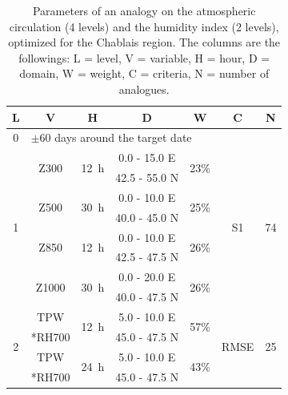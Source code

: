 \documentclass[twocol]{ametsoc}
\begin{document}
\begin{table}[htbp]
	\footnotesize
	\caption{Parameters of an analogy on the atmospheric circulation (4 levels) and the humidity index (2 levels), optimized for the Chablais region. The columns are the followings: L = level, V = variable, H = hour, D = domain, W = weight, C = criteria, N = number of analogues.}
	\begin{center}
		\begin{tabular}{ccccccc}
			\hline \textbf{L} & \textbf{V} & \textbf{H} & \textbf{D} & \textbf{W} & \textbf{C} & \textbf{N} \\ 
			\hline 
			0 & \multicolumn{6}{l}{$\pm 60$ days around the target date} \\
			\hline 
			\multirow{8}{*}{1} &  \multirow{2}{*}{Z300} & \multirow{2}{*}{12~h} & 0.0 - 15.0 \degree E & \multirow{2}{*}{23\%} & \multirow{8}{*}{S1} & \multirow{8}{*}{74} \\
			& & & 42.5 - 55.0 \degree N & & & \\ 
			& \multirow{2}{*}{Z500} & \multirow{2}{*}{30~h} & 0.0 - 10.0 \degree E & \multirow{2}{*}{25\%} & & \\ 
			& & & 40.0 - 45.0 \degree N & & & \\ 
			& \multirow{2}{*}{Z850} & \multirow{2}{*}{12~h} & 0.0 - 10.0 \degree E & \multirow{2}{*}{26\%} & & \\ 
			& & & 42.5 - 47.5 \degree N & & & \\ 
			& \multirow{2}{*}{Z1000} & \multirow{2}{*}{30~h} & 0.0 - 20.0 \degree E & \multirow{2}{*}{26\%} & & \\ 
			& & & 40.0 - 47.5 \degree N & & & \\ 
			\hline 
			\multirow{4}{*}{2} & TPW & \multirow{2}{*}{12~h} & 5.0 - 10.0 \degree E & \multirow{2}{*}{57\%} & \multirow{4}{*}{RMSE} & \multirow{4}{*}{25} \\
			& *RH700 & & 45.0 - 47.5 \degree N & & & \\ 
			& TPW & \multirow{2}{*}{24~h} & 5.0 - 10.0 \degree E & \multirow{2}{*}{43\%} & & \\ 
			& *RH700 & & 45.0 - 47.5 \degree N & & & \\ 
			\hline 
		\end{tabular} 
	\end{center}
	\label{table:params_GA_z4_hi2}
\end{table}
\end{document}
